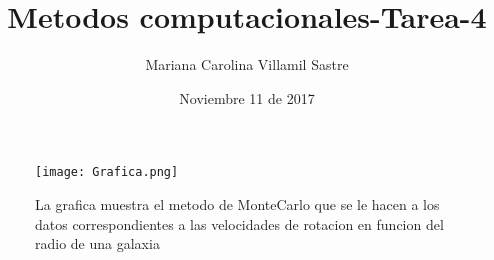 \documentclass[]{article}
\title{Metodos computacionales-Tarea-4}
\author{Mariana Carolina Villamil Sastre}
\date{Noviembre 11 de 2017}
\begin{document}
\begin{figure}[!h]
{
	\texttt{[image: Grafica.png]}
	\caption{La grafica muestra el metodo de MonteCarlo que se le hacen a los datos correspondientes a las velocidades de rotacion en funcion del radio de una galaxia}
}
\end{figure}
\end{document}
